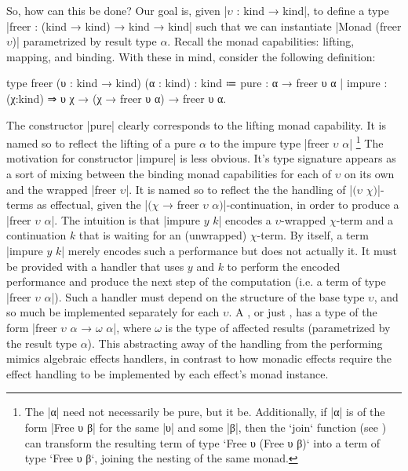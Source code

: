 So, how can this be done?
Our goal is, given \code|$υ$ : kind → kind|, to define a type \code|freer : (kind → kind) → kind → kind| such that we can instantiate \code|Monad (freer $υ$)| parametrized by result type $α$.
Recall the monad capabilities: lifting, mapping, and binding.
With these in mind, consider the following definition:
\begin{program}[caption={Definition of \code|freer|}]
type freer (υ : kind → kind) (α : kind) : kind
  ≔ pure   : α → freer υ α
  | impure : (χ:kind) ⇒ υ χ → (χ → freer υ α) → freer υ α.
\end{program}
The constructor \code|pure| clearly corresponds to the lifting monad capability.
It is named so to reflect the lifting of a pure $α$ to the impure type \code|freer $υ$ $α$|%
\footnote{
  The \code|α| need not necessarily be pure, but it  be.
  Additionally, if \code|α| is of the form \code|Free υ β| for the same \code|υ| and some \code|β|,
  then the \code`join` function (see \prelude\LangC) can transform the resulting term of type \code`Free υ (Free υ β)` into a term of type \code`Free υ β`,
  joining the nesting of the same monad.
}
The motivation for constructor \code|impure| is less obvious.
It's type signature appears as a sort of mixing between the binding monad capabilities for each of $υ$ on its own and the wrapped \code|freer $υ$|.
It is named so to reflect the the handling of \code|$($$υ$ $χ$$)$|-terms as effectual, given the \code|$($$χ$ → freer $υ$ $α$$)$|-continuation, in order to produce a \code|freer $υ$ $α$|.
The intuition is that \code|impure $y$ $k$| encodes a $υ$-wrapped $χ$-term and a continuation $k$ that is waiting for an (unwrapped) $χ$-term.
By itself, a term \code|impure $y$ $k$| merely encodes such a performance but does not actually  it.
It must be provided with a handler that uses $y$ and $k$ to perform the encoded performance and produce the next step of the computation (i.e. a term of type \code|freer $υ$ $α$|).
Such a handler must depend on the structure of the base type $υ$, and so much be implemented separately for each $υ$.
A , or just , has a type of the form \code|freer $υ$ $α$ → $ω$ $α$|, where $ω$ is the type of affected results (parametrized by the result type $α$).
This abstracting away of the handling from the performing mimics algebraic effects handlers, in contrast to how monadic effects require the effect handling to be implemented by each effect's monad instance.

